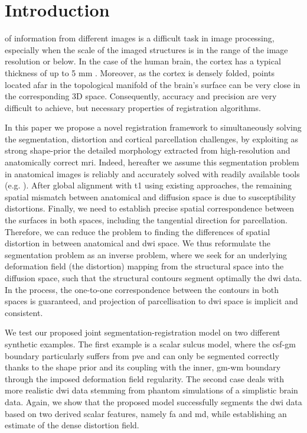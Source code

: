 \section{Introduction}
\label{sec:introduction}

 of information from different images is a difficult
  task in image processing, especially when the scale of the imaged structures
  is in the range of the image resolution or below.
In the case of the human brain, the cortex has a typical thickness of up to 5 mm
  \citep{fischl_measuring_2000}.
Moreover, as the cortex is densely folded, points located afar in the topological
  manifold of the brain's surface can be very close in the corresponding 3D space.
Consequently, accuracy and precision are very difficult to achieve, but necessary properties
  of registration algorithms.

In this paper we propose a novel registration framework to simultaneously
solving the segmentation, distortion and cortical parcellation challenges,
by exploiting as strong shape-prior the detailed morphology extracted
from high-resolution and anatomically correct \gls{mri}.
Indeed, hereafter
we assume this segmentation problem in anatomical images is reliably and
accurately solved with readily available tools (e.g.
\citep{fischl_freesurfer_2012}).
After global alignment with \gls{t1} using existing approaches, the remaining
spatial mismatch between anatomical and diffusion space is due to susceptibility
distortions.
Finally, we need to establish precise spatial correspondence between the
surfaces in both spaces, including the tangential direction for parcellation.
Therefore, we can reduce the problem to finding the differences of spatial
distortion in between anatomical and \gls{dwi} space.
We thus reformulate the segmentation problem as an inverse problem, where we
seek for an underlying deformation field (the distortion) mapping
from the structural space into the diffusion space, such that the structural
contours segment optimally the \gls{dwi} data.
In the process, the one-to-one
correspondence between the contours in both spaces is guaranteed, and projection
of parcellisation to \gls{dwi} space is implicit and consistent.

We test our proposed joint segmentation-registration model on two different
synthetic examples.
The first example is a scalar sulcus model, where the
\gls{csf}-\gls{gm} boundary particularly suffers from \gls{pve} and can only be
segmented correctly thanks to the shape prior and its coupling with the inner,
\gls{gm}-\gls{wm} boundary through the imposed deformation field regularity.
The second case deals with more realistic \gls{dwi} data stemming from
phantom simulations of a simplistic brain data.
Again, we show that the
proposed model successfully segments the \gls{dwi} data based on two derived
scalar features, namely \gls{fa} and \gls{md}, while establishing an estimate
of the dense distortion field.

